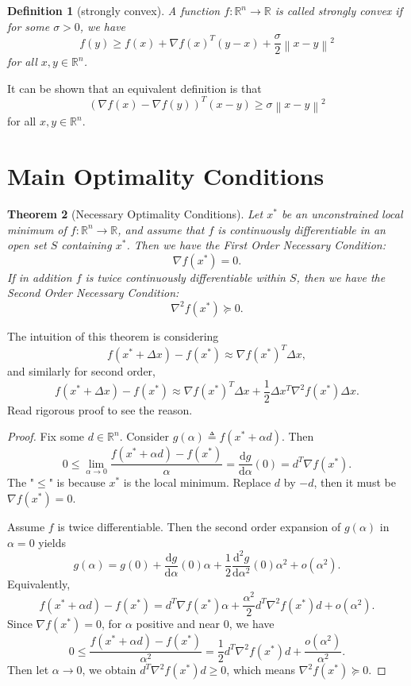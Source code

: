 \documentclass[12pt,a4paper]{article}
\numberwithin{equation}{section}
\theoremstyle{mystyle}
\newtheorem{definition}{Definition}[section]
\newtheorem{theorem}[definition]{Theorem}
\newcommand{\R}{\mathbb{R}}
\newcommand{\grad}{\nabla}
\renewcommand{\d}{\mathrm{d}}
\newcommand{\norm}[1]{\left\lVert #1 \right\rVert}
\begin{document}
	
	\begin{definition}[strongly convex]
		A function $f:\R^n \to \R$ is called \emph{strongly convex} if for some $\sigma>0$, we have
		\begin{equation}
			f(y)\geq f(x)+\grad f(x)^T (y-x)+\frac{\sigma}{2}\norm{x-y}^2
		\end{equation}
		for all $x,y\in \R^n$.
	\end{definition}
	It can be shown that an equivalent definition is that
	\begin{equation}
		(\grad f(x)-\grad f(y))^T(x-y)\geq \sigma \norm{x-y}^2
	\end{equation}
	for all $x,y\in \R^n$.
	
	

	\section{Main Optimality Conditions}
	\begin{theorem}[Necessary Optimality Conditions]
		Let $x^*$ be an unconstrained local minimum of $f:\R^n \to \R$, and assume that $f$ is continuously differentiable in an open set $S$ containing $x^*$. Then we have the \emph{First Order Necessary Condition}:
		\begin{equation}
			\grad f(x^*)=0.
		\end{equation}
		If in addition $f$ is twice continuously differentiable within $S$, then we have the \emph{Second Order Necessary Condition}:
		\begin{equation}
			\grad^2 f(x^*)\succeq 0.
		\end{equation}
	\end{theorem}
	The intuition of this theorem is considering
	$$
	f(x^*+\Delta x)-f(x^*)\approx \grad f(x^*)^T \Delta x,
	$$
	and similarly for second order,
	$$
	f(x^*+\Delta x)-f(x^*)\approx \grad f(x^*)^T \Delta x +\frac{1}{2}\Delta x^T \grad^2 f(x^*)\Delta x.
	$$
	Read rigorous proof to see the reason.
	\begin{proof}
		Fix some $d\in \R^n$. Consider $g(\alpha)\triangleq f(x^*+\alpha d)$. Then
		$$
		0\leq 
		\lim_{\alpha\to 0}\frac{f(x^*+\alpha d)-f(x^*)}{\alpha} 
		= \frac{\d g}{\d \alpha}(0)=d^T \grad f(x^*).
		$$
		The "$\leq$" is because $x^*$ is the local minimum. Replace $d$ by $-d$, then it must be $\grad f(x^*)=0$.
		
		Assume $f$ is twice differentiable. Then the second order expansion of $g(\alpha)$ in $\alpha=0$ yields
		$$
		g(\alpha) = g(0) + \frac{\d g}{\d \alpha}(0)\alpha +
		\frac{1}{2} \frac{\d^2 g}{\d \alpha^2}(0) \alpha^2 + o(\alpha^2).
		$$
		Equivalently,
		$$
		f(x^*+\alpha d) - f(x^*) = d^T \grad f(x^*)\alpha + \frac{\alpha^2}{2} d^T \grad^2 f(x^*) d + o(\alpha^2).
		$$
		Since $\grad f(x^*)=0$, for $\alpha$ positive and near 0, we have
		$$
		0\leq \frac{f(x^*+\alpha d)-f(x^*)}{\alpha^2}= 
		\frac{1}{2} d^T \grad^2 f(x^*) d + \frac{o(\alpha^2)}{\alpha^2}.
		$$
		Then let $\alpha\to 0$, we obtain $d^T \grad^2 f(x^*) d\geq 0$, which means $\grad^2 f(x^*) \succeq 0$.
	\end{proof}
	
\end{document}

